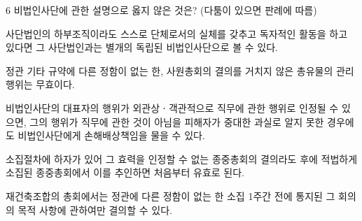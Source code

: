 \begin{question}{6}
비법인사단에 관한 설명으로 옳지 않은 것은? (다툼이 있으면 판례에 따름)
\begin{choices}
  \item 사단법인의 하부조직이라도 스스로 단체로서의 실체를 갖추고 독자적인 활동을 하고 있다면 그 사단법인과는 별개의 독립된 비법인사단으로 볼 수 있다.
  \item 정관 기타 규약에 다른 정함이 없는 한, 사원총회의 결의를 거치지 않은 총유물의 관리행위는 무효이다.
  \item 비법인사단의 대표자의 행위가 외관상ㆍ객관적으로 직무에 관한 행위로 인정될 수 있으면, 그의 행위가 직무에 관한 것이 아님을 피해자가 중대한 과실로 알지 못한 경우에도 비법인사단에게 손해배상책임을 물을 수 있다.
  \item 소집절차에 하자가 있어 그 효력을 인정할 수 없는 종중총회의 결의라도 후에 적법하게 소집된 종중총회에서 이를 추인하면 처음부터 유효로 된다.
  \item 재건축조합의 총회에서는 정관에 다른 정함이 없는 한 소집 1주간 전에 통지된 그 회의의 목적 사항에 관하여만 결의할 수 있다.
\end{choices}
\end{question}

